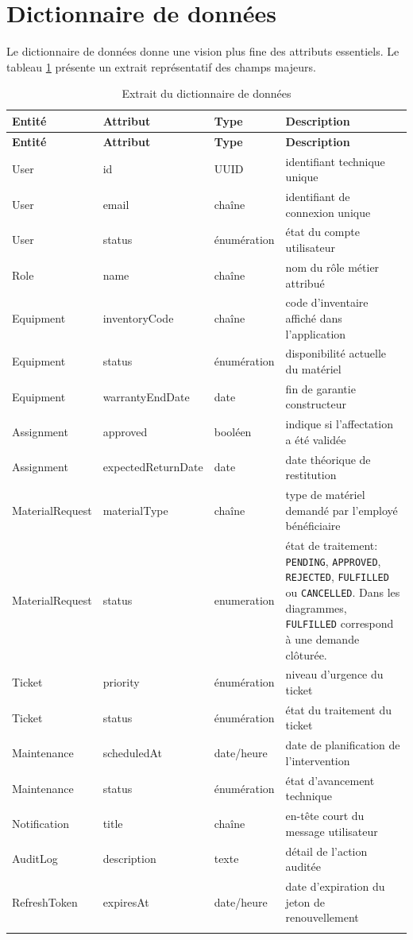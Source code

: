 ﻿\documentclass[12pt,a4paper,oneside]{report}
\begin{document}
\section{Dictionnaire de données}
Le dictionnaire de données donne une vision plus fine des attributs essentiels. Le tableau \ref{tab:data-dictionary} présente un extrait représentatif des champs majeurs.

\begin{longtable}{p{2.6cm}p{3.2cm}p{2.5cm}p{6.2cm}}
\caption{Extrait du dictionnaire de données}\\
\toprule
\textbf{Entité} & \textbf{Attribut} & \textbf{Type} & \textbf{Description} \\
\midrule
\endfirsthead
\toprule
\textbf{Entité} & \textbf{Attribut} & \textbf{Type} & \textbf{Description} \\
\midrule
\endhead
User & id & UUID & identifiant technique unique \\
User & email & chaîne & identifiant de connexion unique \\
User & status & énumération & état du compte utilisateur \\
Role & name & chaîne & nom du rôle métier attribué \\
Equipment & inventoryCode & chaîne & code d'inventaire affiché dans l'application \\
Equipment & status & énumération & disponibilité actuelle du matériel \\
Equipment & warrantyEndDate & date & fin de garantie constructeur \\
Assignment & approved & booléen & indique si l'affectation a été validée \\
Assignment & expectedReturnDate & date & date théorique de restitution \\
MaterialRequest & materialType & chaîne & type de matériel demandé par l'employé bénéficiaire \\
MaterialRequest & status & enumeration & état de traitement: \texttt{PENDING}, \texttt{APPROVED}, \texttt{REJECTED}, \texttt{FULFILLED} ou \texttt{CANCELLED}. Dans les diagrammes, \texttt{FULFILLED} correspond à une demande clôturée. \\
Ticket & priority & énumération & niveau d'urgence du ticket \\
Ticket & status & énumération & état du traitement du ticket \\
Maintenance & scheduledAt & date/heure & date de planification de l'intervention \\
Maintenance & status & énumération & état d'avancement technique \\
Notification & title & chaîne & en-tête court du message utilisateur \\
AuditLog & description & texte & détail de l'action auditée \\
RefreshToken & expiresAt & date/heure & date d'expiration du jeton de renouvellement \\
\bottomrule
\label{tab:data-dictionary}
\end{longtable}
\end{document}
